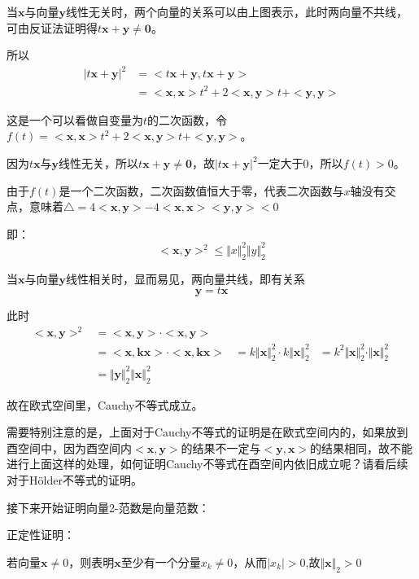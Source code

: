 \documentclass[12pt, a4paper, oneside, UTF8]{ctexbook}
\begin{document}
当$\boldsymbol{x}$与向量$\boldsymbol{y}$线性无关时，两个向量的关系可以由上图表示，此时两向量不共线，可由反证法证明得$t\boldsymbol{x+y}\neq\boldsymbol{0}$。

所以
\[\begin{aligned}
|t\boldsymbol{x+y}|^2&=<t\boldsymbol{x+y}, t\boldsymbol{x+y}>\\
&=<\boldsymbol{x,x}>t^2+2<\boldsymbol{x,y}>t+<\boldsymbol{y,y}>
\end{aligned}
\]

这是一个可以看做自变量为$t$的二次函数，令$f(t)=<\boldsymbol{x,x}>t^2+2<\boldsymbol{x,y}>t+<\boldsymbol{y,y}>$。

因为$t\boldsymbol{x}$与$\boldsymbol{y}$线性无关，所以$t\boldsymbol{x+y}\neq\boldsymbol{0}$，故$|t\boldsymbol{x+y}|^2$一定大于0，所以$f(t)>0$。

由于$f(t)$是一个二次函数，二次函数值恒大于零，代表二次函数与$x$轴没有交点，意味着$\triangle=4<\boldsymbol{x,y}>-4<\boldsymbol{x,x}><\boldsymbol{y,y}><0$

即：
\[
<\boldsymbol{x,y}>^2\leq \Vert x\Vert_2^2\Vert y\Vert_2^2
\]

当$\boldsymbol{x}$与向量$\boldsymbol{y}$线性相关时，显而易见，两向量共线，即有关系\[\boldsymbol{y=}t\boldsymbol{x}\]

此时
\[\begin{aligned}
    <\boldsymbol{x},\boldsymbol{y}>^2&=<\boldsymbol{x},\boldsymbol{y}>\cdot<\boldsymbol{x},\boldsymbol{y}>\\
    &=<\boldsymbol{x, kx}>\cdot<\boldsymbol{x, kx}>
    &=k\Vert \boldsymbol{x}\Vert_2^2\cdot k\Vert \boldsymbol{x}\Vert_2^2
    &=k^2\Vert \boldsymbol{x}\Vert_2^2\cdot \Vert \boldsymbol{x}\Vert_2^2\\
    &=\Vert \boldsymbol{y}\Vert_2^2\Vert \boldsymbol{x}\Vert_2^2
\end{aligned}\
\]

故在欧式空间里，Cauchy不等式成立。

需要特别注意的是，上面对于Cauchy不等式的证明是在欧式空间内的，如果放到酉空间中，因为酉空间内$<\boldsymbol{x}, \boldsymbol{y}>$的结果不一定与$<\boldsymbol{y}, \boldsymbol{x}>$的结果相同，故不能进行上面这样的处理，如何证明Cauchy不等式在酉空间内依旧成立呢？请看后续对于Hölder不等式的证明。

接下来开始证明向量2-范数是向量范数：

\noindent
正定性证明：

若向量$\boldsymbol{x}\neq 0$，则表明$\boldsymbol{x}$至少有一个分量$x_k\neq 0$，从而$|x_k|>0$,故$\Vert \boldsymbol{x}\Vert_2>0$
\end{document}
